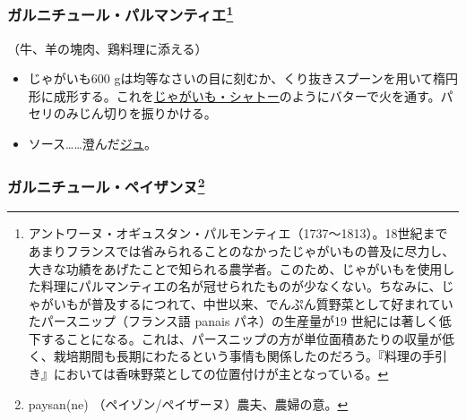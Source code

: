 \begin{recette}
\hypertarget{garniture-parmentier}{%
\subsubsection[ガルニチュール・パルマンティエ]{\texorpdfstring{ガルニチュール・パルマンティエ\footnote{アントワーヌ・オギュスタン・パルモンティエ（1737〜1813）。18世紀まであまりフランスでは省みられることのなかったじゃがいもの普及に尽力し、大きな功績をあげたことで知られる農学者。このため、じゃがいもを使用した料理にパルマンティエの名が冠せられたものが少なくない。ちなみに、じゃがいもが普及するにつれて、中世以来、でんぷん質野菜として好まれていたパースニップ（フランス語
  panais パネ）の生産量が19
  世紀には著しく低下することになる。これは、パースニップの方が単位面積あたりの収量が低く、栽培期間も長期にわたるという事情も関係したのだろう。『料理の手引き』においては香味野菜としての位置付けが主となっている。}}{ガルニチュール・パルマンティエ}}\label{garniture-parmentier}}



（牛、羊の塊肉、鶏料理に添える）

\begin{itemize}
\item
  じゃがいも600
  gは均等なさいの目に刻むか、くり抜きスプーンを用いて楕円形に成形する。これを\protect\hyperlink{pommes-de-terre-chateau}{じゃがいも・シャトー}のようにバターで火を通す。パセリのみじん切りを振りかける。
\item
  ソース\ldots{}\ldots{}澄んだ\protect\hyperlink{jus-de-veau-lie}{ジュ}。
\end{itemize}

\hypertarget{garniture-a-la-payasanne}{%
\subsubsection[ガルニチュール・ペイザンヌ]{\texorpdfstring{ガルニチュール・ペイザンヌ\footnote{paysan(ne)
  （ペイゾン/ペイザーヌ）農夫、農婦の意。}}{ガルニチュール・ペイザンヌ}}\label{garniture-a-la-payasanne}}




\end{recette}
